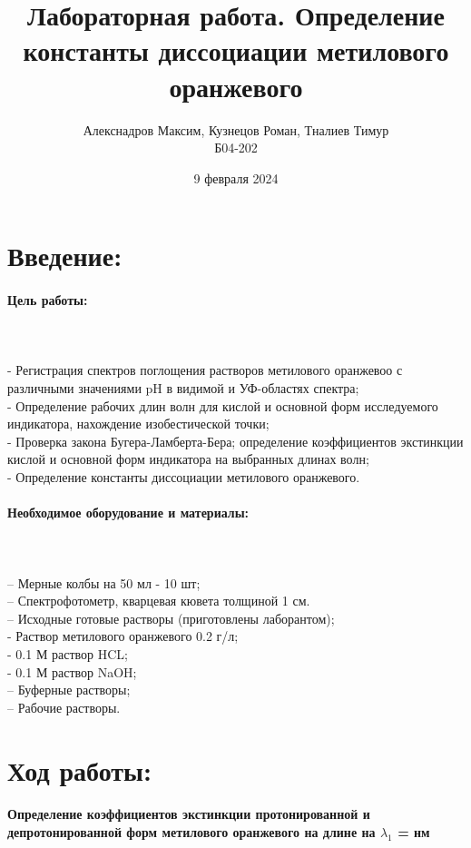 \documentclass[a4paper,12pt]{article} %
\title{\textbf{Лабораторная работа. Определение константы диссоциации метилового оранжевого} }
\author{Алекснадров Максим, Кузнецов Роман, Тналиев Тимур \\ Б04-202}
\date{9 февраля 2024}
\begin{document}
\maketitle

\section{Введение:}
\paragraph{Цель работы:}
\quad
\\
\\ - Регистрация спектров поглощения растворов метилового оранжевоо с различными значениями pH в видимой и УФ-областях спектра;
\\ - Определение рабочих длин волн для кислой и основной форм исследуемого индикатора, нахождение изобестической точки;
\\ - Проверка закона Бугера-Ламберта-Бера; определение коэффициентов экстинкции кислой и основной форм индикатора на выбранных длинах волн;
\\ - Определение константы диссоциации метилового оранжевого.
\paragraph{Необходимое оборудование и материалы:}
\quad
\\
\\ -- Мерные колбы на 50 мл - 10 шт;
\\ -- Спектрофотометр, кварцевая кювета толщиной 1 см.
\\ -- Исходные готовые растворы (приготовлены лаборантом);
\\ \quad - Раствор метилового оранжевого 0.2 г/л;
\\ \quad - 0.1 М раствор HCL;
\\ \quad - 0.1 М раствор NaOH;
\\ -- Буферные растворы;
\\ -- Рабочие растворы.

\section{Ход работы:}
\paragraph{Определение коэффициентов экстинкции протонированной и депротонированной форм метилового оранжевого на длине на $\lambda_1$ = нм}
\end{document}
